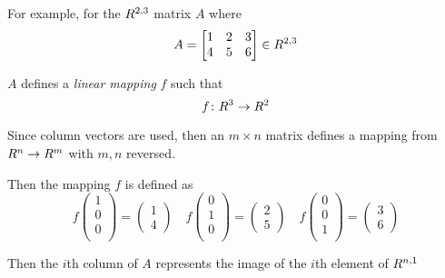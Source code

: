 \begin{remark}
    For example, for the $\relax{R}^{2, 3}$ matrix $A$ where
    \begin{equation}
        A = \begin{bmatrix}
            1 & 2 & 3 \\
            4 & 5 & 6
        \end{bmatrix} \in \relax{R}^{2, 3}
    \end{equation}
    
    $A$ defines a \textit{linear mapping} $f$ such that
    \begin{equation}
        f \colon \relax{R}^{3} \to \relax{R}^{2}
    \end{equation}
    
    Since column vectors are used, then an $m \times n$ matrix defines a mapping from $\relax{R}^{n} \to \relax{R}^{m}$ with $m, n$ reversed.
    
    Then the mapping $f$ is defined as
    \begin{equation}
        f \begin{pmatrix}
            1 \\
            0 \\
            0 \\
        \end{pmatrix} = \begin{pmatrix}
            1 \\
            4
        \end{pmatrix} 
        \quad
        f \begin{pmatrix}
            0 \\
            1 \\
            0 \\
        \end{pmatrix} = \begin{pmatrix}
            2 \\
            5
        \end{pmatrix} 
        \quad
        f \begin{pmatrix}
            0 \\
            0 \\
            1 \\
        \end{pmatrix} = \begin{pmatrix}
            3 \\
            6
        \end{pmatrix} 
    \end{equation}
    
    Then the $i$th column of $A$ represents the image of the $i$th element of $\relax{R}^{n, 1}$
\end{remark}

